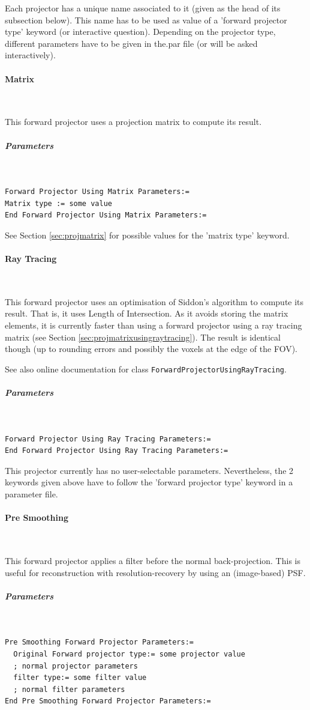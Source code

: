 \documentclass{article}
\newcommand{\subsubsubsection}[1]{\paragraph{#1}\mbox{} \\}
\newcommand{\subsubsubsubsection}[1]{\subparagraph{#1} \mbox{} \\}
\begin{document}
{{Each projector has a unique name associated to it (given as the 
head of its subsection below). This name has to be used as value 
of a 'forward projector type' keyword (or interactive question). 
Depending on the projector type, different parameters have to 
be given in the.par file (or will be asked interactively).

{ \subsubsubsection{Matrix}
}
This forward projector uses a projection matrix to compute its 
result.

{ \subsubsubsubsection{Parameters}
}
\begin{verbatim}
Forward Projector Using Matrix Parameters:=
Matrix type := some value
End Forward Projector Using Matrix Parameters:=
\end{verbatim}

See Section \ref{sec:projmatrix} for possible values for the 'matrix type' keyword.

{ \subsubsubsection{Ray Tracing}
}
This forward projector uses an optimisation of Siddon's algorithm 
to compute its result. That is, it uses Length of Intersection. 
As it avoids storing the matrix elements, it is currently faster 
than using a forward projector using a ray tracing matrix (see 
Section \ref{sec:projmatrixusingraytracing}). The result is identical though (up to rounding 
errors and possibly the voxels at the edge of the FOV).


See also online documentation for class \texttt{ForwardProjectorUsingRayTracing}.

{ \subsubsubsubsection{Parameters}
}
\begin{verbatim}
Forward Projector Using Ray Tracing Parameters:=
End Forward Projector Using Ray Tracing Parameters:=
\end{verbatim}

This projector currently has no user-selectable parameters. Nevertheless, 
the 2 keywords given above have to follow the 'forward projector 
type' keyword in a parameter file.

{ \subsubsubsection{Pre Smoothing}
}
This forward projector applies a filter before the normal back-projection.
This is useful for reconstruction with resolution-recovery 
by using an (image-based) PSF.

{ \subsubsubsubsection{Parameters}
}
\begin{verbatim}
Pre Smoothing Forward Projector Parameters:=
  Original Forward projector type:= some projector value 
  ; normal projector parameters
  filter type:= some filter value
  ; normal filter parameters
End Pre Smoothing Forward Projector Parameters:=
\end{verbatim}

}}
\end{document}

